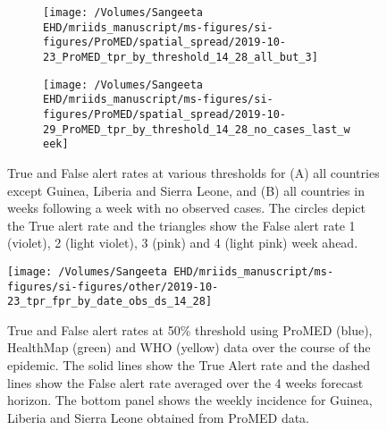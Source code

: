 \documentclass[9pt,twoside,lineno]{pnas-new}
\begin{document}
\begin{figure}
\centering
\begin{subfigure}[b]{0.45\textwidth}
\texttt{[image: /Volumes/Sangeeta EHD/mriids\_manuscript/ms-figures/si-figures/ProMED/spatial\_spread/2019-10-23\_ProMED\_tpr\_by\_threshold\_14\_28\_all\_but\_3]}
\end{subfigure}
\begin{subfigure}[b]{0.45\textwidth}
\texttt{[image: /Volumes/Sangeeta
  EHD/mriids\_manuscript/ms-figures/si-figures/ProMED/spatial\_spread/2019-10-29\_ProMED\_tpr\_by\_threshold\_14\_28\_no\_cases\_last\_week]}
\end{subfigure}
\caption{True and False alert rates at various thresholds for (A) all
  countries except Guinea, Liberia and Sierra Leone, and (B) all
  countries in weeks following a week with no observed cases. The
  circles depict the True alert rate and the triangles show the False
  alert rate 1 (violet), 2 (light violet), 3 (pink) and 4
  (light pink) week ahead.}
\label{fig:tprbythreshold}
\end{figure}\FloatBarrier


\begin{figure}
\centering
\texttt{[image: /Volumes/Sangeeta EHD/mriids\_manuscript/ms-figures/si-figures/other/2019-10-23\_tpr\_fpr\_by\_date\_obs\_ds\_14\_28]}
\caption{True and False alert rates at 50\% threshold using ProMED
  (blue), HealthMap (green) and WHO (yellow) data 
  over the course of the epidemic. The solid lines show the True Alert
rate and the dashed lines show the False alert rate
averaged over the 4 weeks forecast horizon. The bottom panel shows the
weekly incidence for Guinea, Liberia and Sierra Leone obtained from
ProMED data.}
\label{fig:tprovertime}
\end{figure}\FloatBarrier
\end{document}
